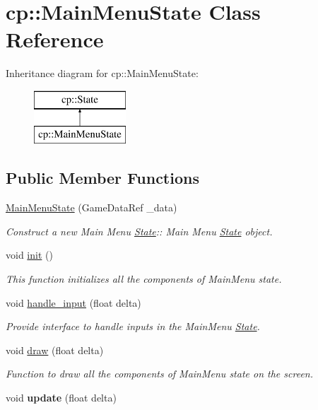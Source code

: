 \hypertarget{classcp_1_1_main_menu_state}{}\section{cp\+:\+:Main\+Menu\+State Class Reference}
\label{classcp_1_1_main_menu_state}
Inheritance diagram for cp\+:\+:Main\+Menu\+State\+:\begin{figure}[H]
\begin{center}
\leavevmode
\includegraphics[height=2.000000cm]{classcp_1_1_main_menu_state}
\end{center}
\end{figure}
\subsection*{Public Member Functions}
\begin{DoxyCompactItemize}
\item 
\hyperlink{classcp_1_1_main_menu_state_a6ad449e3f50223aecb2e6639105235e2}{Main\+Menu\+State} (Game\+Data\+Ref \+\_\+data)
\begin{DoxyCompactList}\small\item\em Construct a new Main Menu \hyperlink{classcp_1_1_state}{State}\+:\+: Main Menu \hyperlink{classcp_1_1_state}{State} object. \end{DoxyCompactList}\item 
\mbox{\label{classcp_1_1_main_menu_state_a3131fe5e7e02165b10e7dd04a67c7efd}} 
void \hyperlink{classcp_1_1_main_menu_state_a3131fe5e7e02165b10e7dd04a67c7efd}{init} ()
\begin{DoxyCompactList}\small\item\em This function initializes all the components of Main\+Menu state. \end{DoxyCompactList}\item 
void \hyperlink{classcp_1_1_main_menu_state_a93e8ff7b27011d2f0bd0ad9a1da783e7}{handle\+\_\+input} (float delta)
\begin{DoxyCompactList}\small\item\em Provide interface to handle inputs in the Main\+Menu \hyperlink{classcp_1_1_state}{State}. \end{DoxyCompactList}\item 
void \hyperlink{classcp_1_1_main_menu_state_a1aabf2a9efa15f4cfbe6e6680472f955}{draw} (float delta)
\begin{DoxyCompactList}\small\item\em Function to draw all the components of Main\+Menu state on the screen. \end{DoxyCompactList}\item 
\mbox{\label{classcp_1_1_main_menu_state_adf44b3ace26aa70890dfddc95221ba3e}} 
void {\bfseries update} (float delta)
\end{DoxyCompactItemize}
